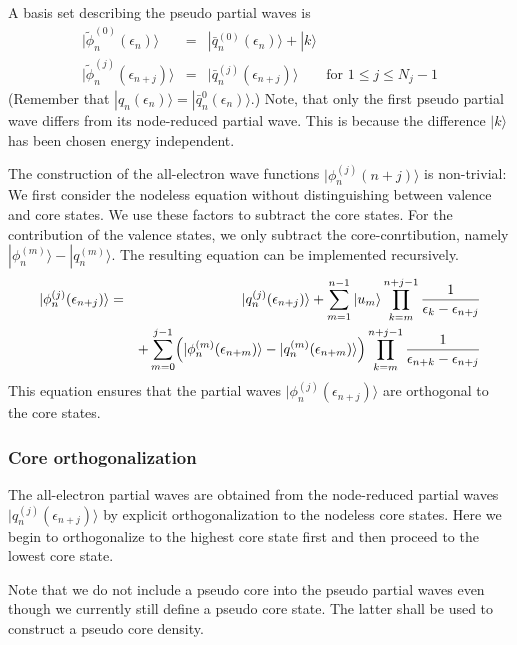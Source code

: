 \documentclass[11pt,a4paper]{report}
\begin{document}
A basis set describing the pseudo partial waves is
\begin{eqnarray}
|\tilde{\phi}_n^{(0)}(\epsilon_n)\rangle&=&|\bar{q}_n^{(0)}(\epsilon_n)\rangle+|k\rangle
\nonumber\\
|\tilde{\phi}_n^{(j)}(\epsilon_{n+j})\rangle
&=&|\bar{q}_n^{(j)}(\epsilon_{n+j})\rangle
\qquad\text{for $1\le j\le N_j-1$}
\label{eq:tildephijfromqbar}
\end{eqnarray}
(Remember that
$|q_n(\epsilon_n)\rangle=|\bar{q}^{0}_n(\epsilon_n)\rangle$.)
Note, that only the first pseudo partial wave differs from its
node-reduced partial wave. This is because the difference $|k\rangle$
has been chosen energy independent.

The construction of the all-electron wave functions
$|\phi_n^{(j)}(n+j)\rangle$ is non-trivial: We first consider the
nodeless equation without distinguishing between valence and core
states. We use these factors to subtract the core states. For the
contribution of the valence states, we only subtract the
core-conrtibution, namely
$|\phi_n^{(m)}\rangle-|q_n^{(m)}\rangle$. The resulting equation can
be implemented recursively.
\begin{eqnarray}
|\phi_n^{(j)}(\epsilon_{n+j})\rangle&=&
|q_n^{(j)}(\epsilon_{n+j})\rangle
+\sum_{m=1}^{n-1}|u_m\rangle\prod_{k=m}^{n+j-1}\frac{1}{\epsilon_k-\epsilon_{n+j}}
\nonumber\\
&&
+\sum_{m=0}^{j-1}\Bigl(|\phi_n^{(m)}(\epsilon_{n+m})\rangle-|q_n^{(m)}(\epsilon_{n+m})\rangle\Bigr)
\prod_{k=m}^{n+j-1}\frac{1}{\epsilon_{n+k}-\epsilon_{n+j}}
\end{eqnarray}
This equation ensures that the partial waves
$|\phi_n^{(j)}(\epsilon_{n+j})\rangle$ are orthogonal to the core
states.


\subsubsection{Core orthogonalization}
The all-electron partial waves are obtained from the node-reduced
partial waves $|q_n^{(j)}(\epsilon_{n+j})\rangle$ by explicit
orthogonalization to the nodeless core states. Here we begin to
orthogonalize to the highest core state first and then proceed to the
lowest core state.

Note that we do not include a pseudo core into the pseudo partial
waves even though we currently still define a pseudo core state. The
latter shall be used to construct a pseudo core density.
\end{document}
